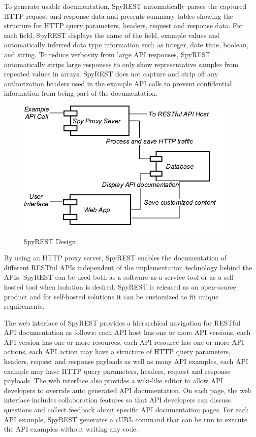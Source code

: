 To generate usable documentation, SpyREST automatically parses the captured HTTP request and response data and presents summary tables showing the structure for HTTP query parameters, headers, request and response data. For each field, SpyREST displays the name of the field, example values and automatically inferred data type information such as integer, date time, boolean, and string. To reduce verbosity from large API responses, SpyREST automatically strips large responses to only show representative samples from repeated values in arrays. SpyREST does not capture and strip off any authorization headers used in the example API calls to prevent confidential information from being part of the documentation.

\begin{figure}[tbh]
  \centering
  \includegraphics[width=\linewidth]{spyrest_components.png}
  \caption{SpyREST Design}
  \label{fig:components}
\end{figure}

By using an HTTP proxy server, SpyREST enables the documentation of different RESTful APIs independent of the implementation technology behind the APIs. SpyREST can be used both as a software as a service tool or as a self-hosted tool when isolation is desired. SpyREST is released as an open-source product and for self-hosted solutions it can be customized to fit unique requirements.


The web interface of SpyREST provides a hierarchical navigation for RESTful API documentation as follows: each API host has one or more API versions, each API version has one or more resources, each API resource has one or more API actions, each API action may have a structure of HTTP query parameters, headers, request and response payloads as well as many API examples, each API example may have HTTP query parameters, headers, request and response payloads. The web interface also provides a wiki-like editor to allow API developers to override auto generated API documentation. On each page, the web interface includes collaboration features so that API developers can discuss questions and collect feedback about specific API documentation pages. For each API example, SpyREST generates a cURL command that can be run to execute the API examples without writing any code.


